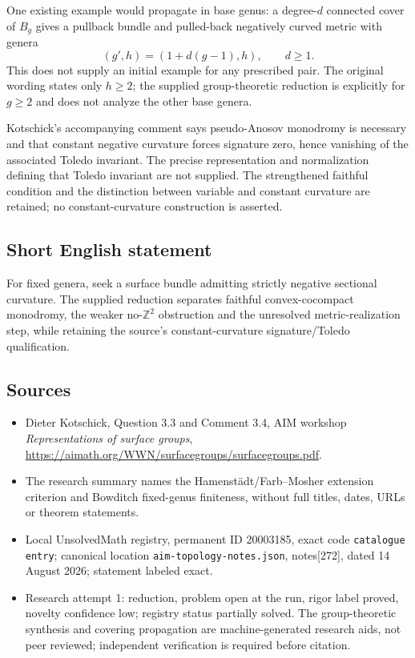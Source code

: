 \documentclass[11pt]{article}
\newcommand{\Z}{\mathbb{Z}}
\begin{document}
One existing example would propagate in base genus: a degree-\(d\) connected cover of \(B_g\) gives a pullback bundle and pulled-back negatively curved metric with genera
\[
(g',h)=(1+d(g-1),h),\qquad d\ge1.
\]
This does not supply an initial example for any prescribed pair. The original wording states only \(h\ge2\); the supplied group-theoretic reduction is explicitly for \(g\ge2\) and does not analyze the other base genera.

Kotschick's accompanying comment says pseudo-Anosov monodromy is necessary and that constant negative curvature forces signature zero, hence vanishing of the associated Toledo invariant. The precise representation and normalization defining that Toledo invariant are not supplied. The strengthened faithful condition and the distinction between variable and constant curvature are retained; no constant-curvature construction is asserted.
\subsection{Short English statement}
For fixed genera, seek a surface bundle admitting strictly negative sectional curvature. The supplied reduction separates faithful convex-cocompact monodromy, the weaker no-\(\Z^2\) obstruction and the unresolved metric-realization step, while retaining the source's constant-curvature signature/Toledo qualification.
\subsection{Sources}
\begin{itemize}
\item Dieter Kotschick, Question 3.3 and Comment 3.4, AIM workshop \emph{Representations of surface groups}, \url{https://aimath.org/WWN/surfacegroups/surfacegroups.pdf}.
\item The research summary names the Hamenst\"adt/Farb--Mosher extension criterion and Bowditch fixed-genus finiteness, without full titles, dates, URLs or theorem statements.
\item Local UnsolvedMath registry, permanent ID 20003185, exact code \texttt{catalogue entry}; canonical location \texttt{aim-topology-notes.json}, notes[272], dated 14 August 2026; statement labeled exact.
\item Research attempt 1: reduction, problem open at the run, rigor label proved, novelty confidence low; registry status partially solved. The group-theoretic synthesis and covering propagation are machine-generated research aids, not peer reviewed; independent verification is required before citation.
\end{itemize}
\end{document}
